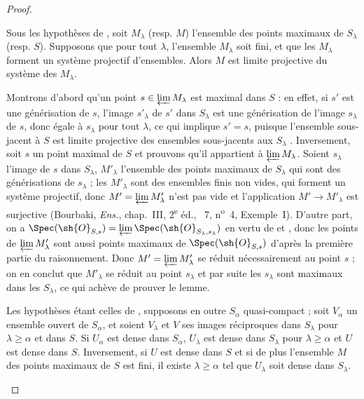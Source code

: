 \begin{proof}
\begin{lemma}[20.3.8.3]
\label{IV.20.3.8.3}
Sous les hypothèses de , soit $M_\lambda$ \textup{(resp. $M$)} l'ensemble des points maximaux de $S_\lambda$ \textup{(resp. $S$)}.
Supposons que pour tout $\lambda$, l'ensemble $M_\lambda$ soit fini, et que les $M_\lambda$ forment un système projectif d'ensembles.
Alors $M$ est limite projective du système des $M_\lambda$.
\end{lemma}

Montrons d'abord qu'un point $s\in\varprojlim M_\lambda$ est maximal dans $S$ : en effet, si $s'$ est une générisation de $s$, l'image $s'_\lambda$ de $s'$ dans $S_\lambda$ est une générisation de l'image $s_\lambda$ de $s$, donc égale à $s_\lambda$ pour tout $\lambda$, ce qui implique $s'=s$, puisque l'ensemble sous-jacent à $S$ est limite projective des ensembles sous-jacents aux $S_\lambda$ .
Inversement, soit $s$ un point maximal de $S$ et prouvons qu'il appartient à $\varprojlim M_\lambda$.
Soient $s_\lambda$ l'image de $s$ dans $S_\lambda$, $M'_\lambda$ l'ensemble des points maximaux de $S_\lambda$ qui sont des générisations de $s_\lambda$ ; les $M'_\lambda$ sont des ensembles finis non vides, qui forment un système projectif, donc $M'=\varprojlim M'_\lambda$ n'est pas vide et l'application $M'\to M'_\lambda$ est surjective (Bourbaki, \emph{Ens.}, chap.~III, 2\textsuperscript{e} éd., \textsection~7, n\textsuperscript{o}~4, Exemple~I).
D'autre part, on a $\Spec(\sh{O}_{S,s})=\varprojlim\Spec(\sh{O}_{S_\lambda,s_\lambda})$ en vertu de  et , donc les points de $\varprojlim M'_\lambda$ sont aussi points maximaux de $\Spec(\sh{O}_{S,s})$ d'après la première partie du raisonnement.
Donc $M'=\varprojlim M'_\lambda$ se réduit nécessairement au point $s$ ; on en conclut que $M'_\lambda$ se réduit au point $s_\lambda$ et par suite les $s_\lambda$ sont maximaux dans les $S_\lambda$, ce qui achève de prouver le lemme.

\begin{lemma}[20.3.8.4]
\label{IV.20.3.8.4}
Les hypothèses étant celles de , supposons en outre $S_\alpha$ quasi-compact ; soit $V_\alpha$ un ensemble ouvert de $S_\alpha$, et soient $V_\lambda$ et $V$ ses images réciproques dans $S_\lambda$ pour $\lambda\geq\alpha$ et dans $S$.
Si $U_\alpha$ est dense dans $S_\alpha$, $U_\lambda$ est dense dans $S_\lambda$ pour $\lambda\geq\alpha$ et $U$ est dense dans $S$.
Inversement, si $U$ est dense dans $S$ et si de plus l'ensemble $M$ des points maximaux de $S$ est fini, il existe $\lambda\geq\alpha$ tel que $U_\lambda$ soit dense dans $S_\lambda$.
\end{lemma}


\end{proof}
